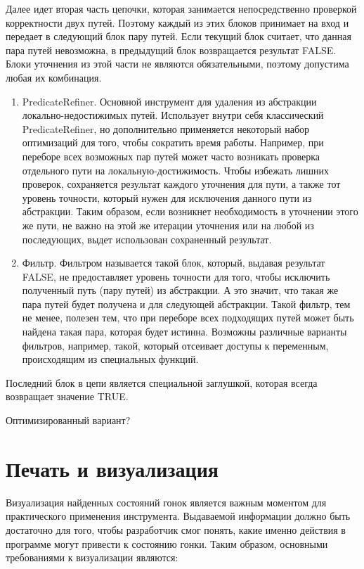 Далее идет вторая часть цепочки, которая занимается непосредственно проверкой корректности двух путей. Поэтому каждый из этих блоков принимает на вход и передает в следующий блок пару путей. Если текущий блок считает, что данная пара путей невозможна, в предыдущий блок возвращается результат FALSE.
Блоки уточнения из этой части не являются обязательными, поэтому допустима любая их комбинация.

\begin{enumerate}

\item PredicateRefiner. Основной инструмент для удаления из абстракции локально-недостижимых путей. 
Использует внутри себя классический PredicateRefiner, но дополнительно применяется некоторый набор оптимизаций для того, чтобы сократить время работы.
Например, при переборе всех возможных пар путей может часто возникать проверка отдельного пути на локальную-достижимость. 
Чтобы избежать лишних проверок, сохраняется результат каждого уточнения для пути, а также тот уровень точности, который нужен для исключения данного пути из абстракции.
Таким образом, если возникнет необходимость в уточнении этого же пути, не важно на этой же итерации уточнения или на любой из последующих, выдет использован сохраненный результат. 

\item Фильтр. Фильтром называется такой блок, который, выдавая результат FALSE, не предоставляет уровень точности для того, чтобы исключить полученный путь (пару путей) из абстракции. А это значит, что такая же пара путей будет получена и для следующей абстракции.
Такой фильтр, тем не менее, полезен тем, что при переборе всех подходящих путей может быть найдена такая пара, которая будет истинна.
Возможны различные варианты фильтров, например, такой, который отсеивает доступы к переменным, происходящим из специальных функций. 

\end{enumerate}

Последний блок в цепи является специальной заглушкой, которая всегда возвращает значение TRUE.

Оптимизированный вариант?

\section{Печать и визуализация} \label{sect_impl_visualization}

Визуализация найденных состояний гонок является важным моментом для практического применения инструмента.
Выдаваемой информации должно быть достаточно для того, чтобы разработчик смог понять, какие именно действия в программе могут привести к состоянию гонки.
Таким образом, основными требованиями к визуализации являются:

